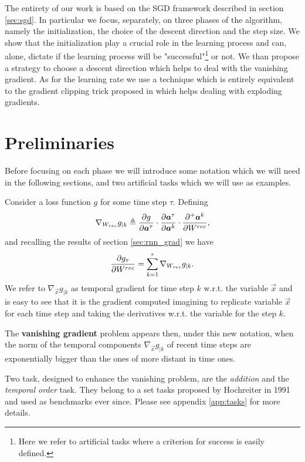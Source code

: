 The entirety of our work is based on the SGD framework described in section \ref{sec:sgd}. In particular we focus, separately, on three phases of the algorithm, namely the initialization, the choice of the descent direction and the step size. We show that the initialization play a crucial role in the learning process and can, alone, dictate if the learning process will be "successful"\footnote{Here we refer to artificial tasks where a criterion for success is easily defined.} or not. We than propose a strategy to choose a descent direction which helps to deal with the vanishing gradient. As for the learning rate we use a technique which is entirely equivalent to the gradient clipping trick proposed in \cite{understandingExplodingGradients} which helps dealing with exploding gradients.


\section{Preliminaries}
Before focusing on each phase we will introduce some notation which we will need in the following sections, and two artificial tasks which we will use as examples.

Consider a loss function $g$ for some time step $\tau$. Defining 
\begin{equation}
\nabla_{W_{rec}} g_{|k}  \triangleq \frac{\partial g}{\partial \boldsymbol{a}^{\tau}} \cdot \frac{\partial \boldsymbol{a}^{\tau}}{\partial \boldsymbol{a}^k} \cdot \frac{\partial^+ \boldsymbol{a}^k}{\partial W^{rec}},
\end{equation}
and recalling the results of section \ref{sec:rnn_grad} we have
\begin{equation}
	\frac{\partial g_{\tau}}{\partial W^{rec}} = \sum_{k=1}^{\tau} \nabla_{W_{rec}} g_{|k}.
\end{equation}
We refer to $\nabla_{\vec{x}} g_{|k}$ as temporal gradient for time step $k$ w.r.t. the variable $\vec{x}$ and is easy to see that it is the gradient computed imagining to replicate variable $\vec{x}$ for each time step and taking the derivatives w.r.t. the variable for the step $k$.

The \textbf{vanishing gradient} problem appears then, under this new notation, when the norm of the temporal components $\nabla_{\vec{x}} g_{|k}$ of recent time steps  are exponentially bigger than the ones of more distant in time ones.

Two task, designed to enhance the vanishing problem, are the \textit{addition} and the \textit{temporal order} task. They belong to a set tasks proposed by Hochreiter\cite{lstm} in 1991 and used as benchmarks ever since. Please see appendix \ref{app:tasks} for more details.

